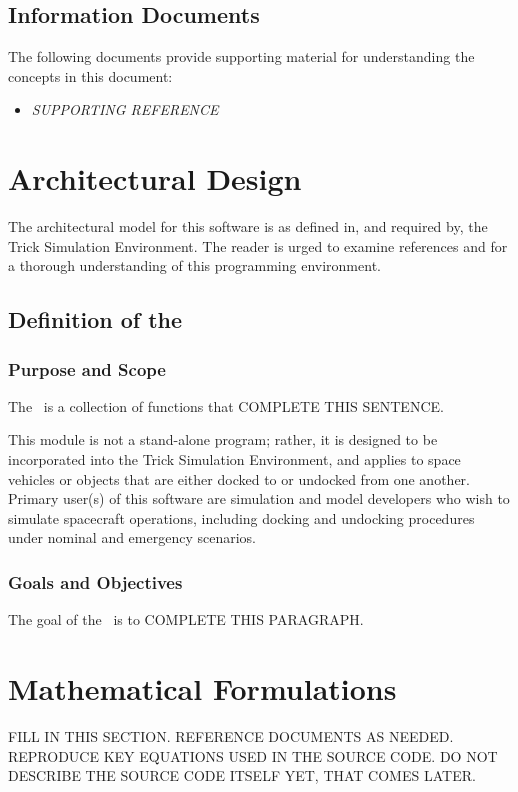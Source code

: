 \documentclass[twoside,11pt,titlepage]{report}
\begin{document}
\section{Information Documents}
The following documents provide supporting material for understanding the
concepts in this document:

\begin{itemize}
\item{\em SUPPORTING REFERENCE} \cite{SUPPORTINGREFERENCE}
\end{itemize}

\chapter{Architectural Design}\label{sec:architectural_design}
The architectural model for this software is as defined in, and
required by, the Trick Simulation Environment.  The reader is urged
to examine references \cite{Vetter:TrickUTM} and \cite{Vetter:TrickVD}
for a thorough understanding of this programming environment.

\section{Definition of the \MODEL}

\subsection{Purpose and Scope}
The \MODEL\ is a collection of functions that COMPLETE THIS SENTENCE.

This module is not a stand-alone program;
rather, it is designed to be incorporated into the Trick
Simulation Environment, and applies to space vehicles or objects that are
either docked to or undocked from one another.
Primary user(s) of this software are simulation and model developers
who wish to simulate spacecraft operations, including docking and
undocking procedures under nominal and emergency scenarios.

\subsection{Goals and Objectives}
The goal of the \MODEL\ is to COMPLETE THIS PARAGRAPH.


\chapter{Mathematical Formulations}\label{sec:math_formulations}
FILL IN THIS SECTION.
REFERENCE DOCUMENTS AS NEEDED.
REPRODUCE KEY EQUATIONS USED IN THE SOURCE CODE.
DO NOT DESCRIBE THE SOURCE CODE ITSELF YET, THAT COMES LATER.
\end{document}
